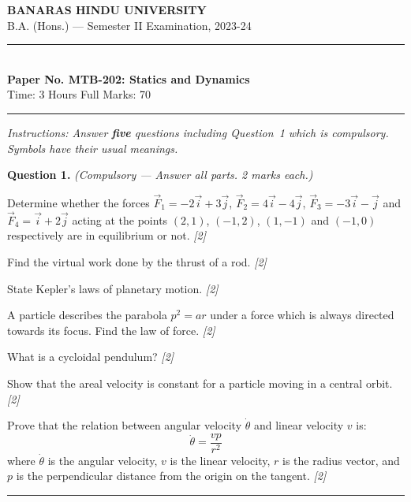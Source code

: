 \documentclass[11pt,a4paper]{article}
\newcommand{\pts}[1]{\hfill   \textit{[#1]}}
\begin{document}
\begin{center}
  {\large\bfseries BANARAS HINDU UNIVERSITY}\\[2pt]
  {\normalsize B.A. (Hons.) --- Semester II Examination, 2023-24}\\[6pt]
  \rule{0.8\linewidth}{0.5pt}\\[6pt]
  {\large\bfseries Paper No. MTB-202: Statics and Dynamics}\\[4pt]
  {\normalsize Time: 3 Hours \hfill Full Marks: 70}
\end{center}
\rule{\linewidth}{0.4pt}
\smallskip



\noindent   \textit{Instructions: Answer   \textbf{five} questions including Question~1 which is compulsory. Symbols have their usual meanings.}
\bigskip




\noindent   \textbf{Question 1.}   \textit{(Compulsory --- Answer all parts. 2 marks each.)}

\begin{parts}
  \item Determine whether the forces $\vec{F}_1 = -2\vec{i} + 3\vec{j}$, $\vec{F}_2 = 4\vec{i} - 4\vec{j}$, $\vec{F}_3 = -3\vec{i} - \vec{j}$ and $\vec{F}_4 = \vec{i} + 2\vec{j}$ acting at the points $(2, 1)$, $(-1, 2)$, $(1, -1)$ and $(-1, 0)$ respectively are in equilibrium or not. \pts{2}
  \item Find the virtual work done by the thrust of a rod. \pts{2}
  \item State Kepler's laws of planetary motion. \pts{2}
  \item A particle describes the parabola $p^2 = ar$ under a force which is always directed towards its focus. Find the law of force. \pts{2}
  \item What is a cycloidal pendulum? \pts{2}
  \item Show that the areal velocity is constant for a particle moving in a central orbit. \pts{2}
  \item Prove that the relation between angular velocity $\dot{ \theta}$ and linear velocity $v$ is:
  \[
  \dot{ \theta} = \frac{vp}{r^2}
  \]
  where $\dot{ \theta}$ is the angular velocity, $v$ is the linear velocity, $r$ is the radius vector, and $p$ is the perpendicular distance from the origin on the tangent. \pts{2}
\end{parts}

\medskip\rule{\linewidth}{0.2pt}

\medskip
\end{document}
